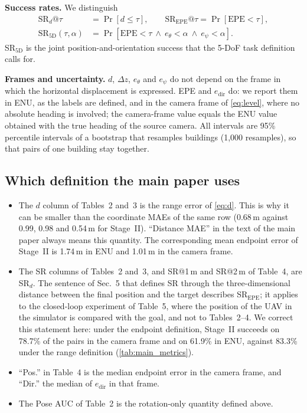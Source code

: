 \documentclass[10pt,twocolumn,letterpaper]{article}
\newcommand{\SRd}{SR$_{d}$}
\newcommand{\SRe}{SR$_{\mathrm{EPE}}$}
\newcommand{\SRf}{SR$_{\mathrm{5D}}$}
\begin{document}
\noindent\textbf{Success rates.} We distinguish
\begin{align}
\text{\SRd}@\tau&=\Pr[d\le\tau],\qquad \text{\SRe}@\tau=\Pr[\mathrm{EPE}<\tau],\\
\text{\SRf}(\tau,\alpha)&=\Pr[\mathrm{EPE}<\tau\ \wedge\ e_\theta<\alpha\ \wedge\ e_\psi<\alpha].
\end{align}
\SRf{} is the joint position-and-orientation success that the 5-DoF task definition calls for.

\noindent\textbf{Frames and uncertainty.} $d$, $\Delta z$, $e_\theta$ and $e_\psi$ do not depend on the frame in which the horizontal displacement is expressed. EPE and $e_{\mathrm{dir}}$ do: we report them in ENU, as the labels are defined, and in the camera frame of \cref{eq:level}, where no absolute heading is involved; the camera-frame value equals the ENU value obtained with the true heading of the source camera. All intervals are 95\% percentile intervals of a bootstrap that resamples buildings (1{,}000 resamples), so that pairs of one building stay together.

\subsection{Which definition the main paper uses}
\label{sec:whichdef}

\begin{itemize}[leftmargin=*,itemsep=1pt,topsep=2pt]
\item The $d$ column of Tables~2 and~3 is the range error of \cref{eq:d}. This is why it can be smaller than the coordinate MAEs of the same row (0.68\,m against 0.99, 0.98 and 0.54\,m for Stage~II). ``Distance MAE'' in the text of the main paper always means this quantity. The corresponding mean endpoint error of Stage~II is 1.74\,m in ENU and 1.01\,m in the camera frame.
\item The SR columns of Tables~2 and~3, and SR@1\,m and SR@2\,m of Table~4, are \SRd. The sentence of Sec.~5 that defines SR through the three-dimensional distance between the final position and the target describes \SRe; it applies to the closed-loop experiment of Table~5, where the position of the UAV in the simulator is compared with the goal, and not to Tables~2--4. We correct this statement here: under the endpoint definition, Stage~II succeeds on 78.7\% of the pairs in the camera frame and on 61.9\% in ENU, against 83.3\% under the range definition (\cref{tab:main_metrics}).
\item ``Pos.'' in Table~4 is the median endpoint error in the camera frame, and ``Dir.'' the median of $e_{\mathrm{dir}}$ in that frame.
\item The Pose AUC of Table~2 is the rotation-only quantity defined above.
\end{itemize}
\end{document}
